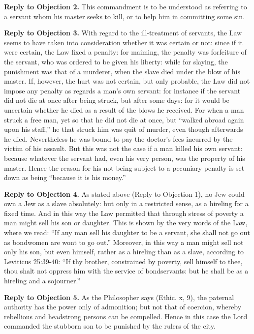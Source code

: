 \textbf{Reply to Objection 2.} This commandment is to be understood as referring to a servant whom his master seeks to kill, or to help him in committing some sin.

\textbf{Reply to Objection 3.} With regard to the ill-treatment of servants, the Law seems to have taken into consideration whether it was certain or not: since if it were certain, the Law fixed a penalty: for maiming, the penalty was forfeiture of the servant, who was ordered to be given his liberty: while for slaying, the punishment was that of a murderer, when the slave died under the blow of his master. If, however, the hurt was not certain, but only probable, the Law did not impose any penalty as regards a man's own servant: for instance if the servant did not die at once after being struck, but after some days: for it would be uncertain whether he died as a result of the blows he received. For when a man struck a free man, yet so that he did not die at once, but ``walked abroad again upon his staff,'' he that struck him was quit of murder, even though afterwards he died. Nevertheless he was bound to pay the doctor's fees incurred by the victim of his assault. But this was not the case if a man killed his own servant: because whatever the servant had, even his very person, was the property of his master. Hence the reason for his not being subject to a pecuniary penalty is set down as being ``because it is his money.''

\textbf{Reply to Objection 4.} As stated above (Reply to Objection 1), no Jew could own a Jew as a slave absolutely: but only in a restricted sense, as a hireling for a fixed time. And in this way the Law permitted that through stress of poverty a man might sell his son or daughter. This is shown by the very words of the Law, where we read: ``If any man sell his daughter to be a servant, she shall not go out as bondwomen are wont to go out.'' Moreover, in this way a man might sell not only his son, but even himself, rather as a hireling than as a slave, according to Leviticus 25:39-40: ``If thy brother, constrained by poverty, sell himself to thee, thou shalt not oppress him with the service of bondservants: but he shall be as a hireling and a sojourner.''

\textbf{Reply to Objection 5.} As the Philosopher says (Ethic. x, 9), the paternal authority has the power only of admonition; but not that of coercion, whereby rebellious and headstrong persons can be compelled. Hence in this case the Lord commanded the stubborn son to be punished by the rulers of the city.

